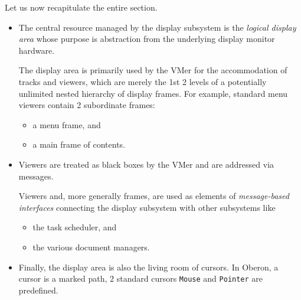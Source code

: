 Let us now recapitulate the entire section.
\begin{itemize}
  \item The central resource managed by the display subsystem is the \emph{logical display area}
    whose purpose is abstraction from the underlying display monitor hardware.

    The display area is primarily used by the VMer for the accommodation of tracks and viewers,
    which are merely the 1st 2 levels of a potentially unlimited nested hierarchy of display frames.
    For example, standard menu viewers contain 2 subordinate frames:
    \begin{itemize}
      \item a menu frame, and
      \item a main frame of contents.
    \end{itemize}

  \item Viewers are treated as black boxes by the VMer and are addressed via messages.

    Viewers and, more generally frames, are used as elements of \emph{message-based interfaces}
    connecting the display subsystem with other subsystems like
    \begin{itemize}
      \item the task scheduler, and
      \item the various document managers.
    \end{itemize}

  \item Finally, the display area is also the living room of cursors.  In Oberon,
    a cursor is a marked path, 2 standard cursors \verb|Mouse| and \verb|Pointer| are predefined.
\end{itemize}
